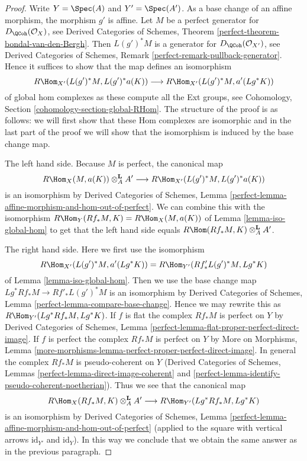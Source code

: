\begin{proof}
Write $Y = \Spec(A)$ and $Y' = \Spec(A')$. As a base change of an affine
morphism, the morphism $g'$ is affine. Let $M$ be a perfect generator
for $D_\QCoh(\mathcal{O}_X)$, see Derived Categories of Schemes, Theorem
\ref{perfect-theorem-bondal-van-den-Bergh}. Then $L(g')^*M$ is a
generator for $D_\QCoh(\mathcal{O}_{X'})$, see
Derived Categories of Schemes, Remark \ref{perfect-remark-pullback-generator}.
Hence it suffices to show that the map defines an isomorphism
$$
R\Hom_{X'}(L(g')^*M, L(g')^*a(K))
\longrightarrow
R\Hom_{X'}(L(g')^*M, a'(Lg^*K))
$$
of global hom complexes as these compute all the Ext groups, see
Cohomology, Section \ref{cohomology-section-global-RHom}.
The structure of the proof is as follows: we will first show that
these Hom complexes are isomorphic and in the last part of the proof
we will show that the isomorphism is induced by the base change map.

\medskip\noindent
The left hand side. Because $M$ is perfect, the canonical map
$$
R\Hom_X(M, a(K)) \otimes^\mathbf{L}_A A'
\longrightarrow
R\Hom_{X'}(L(g')^*M, L(g')^*a(K))
$$
is an isomorphism by Derived Categories of Schemes, Lemma
\ref{perfect-lemma-affine-morphism-and-hom-out-of-perfect}.
We can combine this with the isomorphism
$R\Hom_Y(Rf_*M, K) = R\Hom_X(M, a(K))$
of Lemma \ref{lemma-iso-global-hom}
to get that the left hand side equals
$R\Hom(Rf_*M, K) \otimes^\mathbf{L}_A A'$.

\medskip\noindent
The right hand side. Here we first use the isomorphism
$$
R\Hom_{X'}(L(g')^*M, a'(Lg^*K)) = R\Hom_{Y'}(Rf'_*L(g')^*M, Lg^*K)
$$
of Lemma \ref{lemma-iso-global-hom}. Then we use the base change
map $Lg^*Rf_*M \to Rf'_*L(g')^*M$ is an isomorphism by
Derived Categories of Schemes, Lemma \ref{perfect-lemma-compare-base-change}.
Hence we may rewrite this as $R\Hom_{Y'}(Lg^*Rf_*M, Lg^*K)$.
If $f$ is flat the complex $Rf_*M$ is perfect on $Y$ by
Derived Categories of Schemes, Lemma
\ref{perfect-lemma-flat-proper-perfect-direct-image}.
If $f$ is perfect the complex $Rf_*M$ is perfect on $Y$ by
More on Morphisms, Lemma
\ref{more-morphisms-lemma-perfect-proper-perfect-direct-image}.
In general the complex $Rf_*M$ is pseudo-coherent on $Y$
(Derived Categories of Schemes, Lemmas
\ref{perfect-lemma-direct-image-coherent} and
\ref{perfect-lemma-identify-pseudo-coherent-noetherian}).
Thus we see that the canonical map
$$
R\Hom_X(Rf_*M, K) \otimes^\mathbf{L}_A A'
\longrightarrow
R\Hom_{Y'}(Lg^*Rf_*M, Lg^*K)
$$
is an isomorphism by Derived Categories of Schemes, Lemma
\ref{perfect-lemma-affine-morphism-and-hom-out-of-perfect}
(applied to the square with vertical arrows $\text{id}_{Y'}$
and $\text{id}_Y$). In this way we conclude that we obtain
the same answer as in the previous paragraph.


\end{proof}
